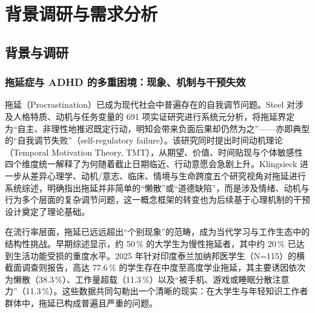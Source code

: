 \clearpage

\section{背景调研与需求分析}


\subsection{背景与调研}


\subsubsection{拖延症与 ADHD 的多重困境：现象、机制与干预失效}


\par 拖延（Procrastination）已成为现代社会中普遍存在的自我调节问题。Steel 对涉及人格特质、动机与任务变量的 691 项实证研究进行系统元分析，将拖延界定为``自主、非理性地推迟既定行动，明知会带来负面后果却仍然为之''——亦即典型的``自我调节失败''（self-regulatory failure）\cite{steel2007nature}。该研究同时提出时间动机理论（Temporal Motivation Theory, TMT），从期望、价值、时间贴现与个体敏感性四个维度统一解释了为何随着截止日期临近、行动意愿会急剧上升。Klingsieck 进一步从差异心理学、动机/意志、临床、情境与生命跨度五个研究视角对拖延进行系统综述\cite{klingsieck2013procrastination}，明确指出拖延并非简单的``懒散''或``道德缺陷''，而是涉及情绪、动机与行为多个层面的复杂调节问题，这一概念框架的转变也为后续基于心理机制的干预设计奠定了理论基础。

\par 在流行率层面，拖延已远远超出``个别现象''的范畴，成为当代学习与工作生态中的结构性挑战。早期综述显示，约 50\,\% 的大学生为慢性拖延者，其中约 20\,\% 已达到生活功能受损的重度水平\cite{klingsieck2013procrastination}。2025 年针对印度泰兰加纳邦医学生（N=115）的横截面调查则报告，高达 77.6\,\% 的学生存在中度至高度学业拖延，其主要诱因依次为懒散（38.3\,\%）、工作量超载（11.3\,\%）以及``被手机、游戏或睡眠分散注意力''（11.3\,\%）\cite{imedj2025prevalence}。这些数据共同勾勒出一个清晰的现实：在大学生与年轻知识工作者群体中，拖延已构成普遍且严重的问题。

